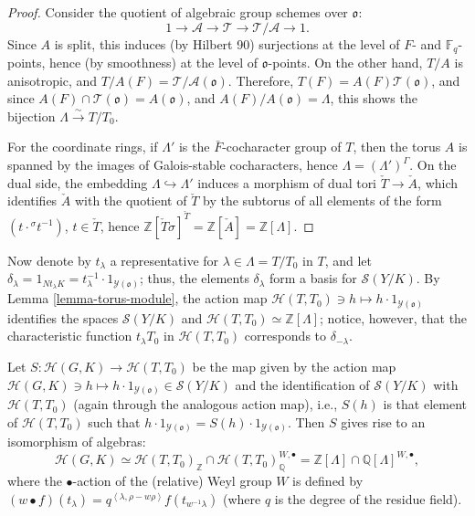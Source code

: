 \begin{proof}
 Consider the quotient of algebraic group schemes over $\mathfrak o$:
 $$ 1\to \mathcal A \to \mathcal T \to \mathcal T/\mathcal A\to 1.$$
 Since $A$ is split, this induces (by Hilbert 90) surjections at the level of $F$- and $\mathbb F_q$-points, hence (by smoothness) at the level of $\mathfrak o$-points.  On the other hand, $T/A$ is anisotropic, and $T/A(F)=\mathcal T/\mathcal A(\mathfrak o)$. Therefore, $T(F) = A(F) \mathcal T(\mathfrak o)$, and since $A(F)\cap \mathcal T(\mathfrak o) = A(\mathfrak o)$, and $A(F)/A(\mathfrak o) = \Lambda$, this shows the bijection $\Lambda \xrightarrow\sim T/T_0$.
 
 For the coordinate rings, if $\Lambda'$ is the $\bar F$-cocharacter group of $T$, then the torus $A$ is spanned by the images of Galois-stable cocharacters, hence $\Lambda = (\Lambda')^\Gamma$. On the dual side, the embedding $\Lambda \hookrightarrow \Lambda'$ induces a morphism of dual tori $\check T \to \check A$, which identifies $\check A$ with the quotient of $\check T$ by the subtorus of all elements of the form $(t\cdot {^\sigma t^{-1}})$, $t\in \check T$, hence   
 $\mathbb Z[\check T\sigma ]^{\check T} = \mathbb Z[\check A] = \mathbb Z[\Lambda]$.
\end{proof}

Now denote by $t_\lambda$ a representative for $\lambda \in \Lambda = T/T_0$ in $T$, and let $\delta_\lambda=1_{N t_\lambda K} = t_\lambda^{-1}\cdot 1_{\mathcal Y(\mathfrak o)}$; thus, the elements $\delta_\lambda$ form a basis for $\mathcal S(Y/K)$. By Lemma \ref{lemma-torus-module}, the action map $\mathcal H(T,T_0)\ni h \mapsto h\cdot 1_{\mathcal Y(\mathfrak o)}$ identifies the spaces $\mathcal S(Y/K)$ and $\mathcal H(T,T_0)\simeq \mathbb Z[\Lambda]$; notice, however, that the characteristic function $t_\lambda T_0$ in $\mathcal H(T,T_0)$ corresponds to $\delta_{-\lambda}$. 

\begin{theorem}
 Let $S: \mathcal H(G,K) \to \mathcal H(T,T_0)$ be the map given by the action map $\mathcal H(G,K)\ni h \mapsto h\cdot 1_{\mathcal Y(\mathfrak o)} \in \mathcal S(Y/K)$ and the identification of $\mathcal S(Y/K)$ with $\mathcal H(T,T_0)$ (again through the analogous action map), i.e., $S(h)$ is that element of $\mathcal H(T,T_0)$ such that $h\cdot 1_{\mathcal Y(\mathfrak o)} = S(h)\cdot 1_{\mathcal Y(\mathfrak o)} $. Then $S$ gives rise to an isomorphism of algebras: 
 \begin{equation}
 \label{equation-Satake}
 \mathcal H(G,K) \simeq \mathcal H(T,T_0)_{\mathbb Z} \cap \mathcal H(T,T_0)_{\mathbb Q}^{W,\bullet} = \mathbb Z[\Lambda]\cap \mathbb Q[\Lambda]^{W,\bullet},
 \end{equation}
 where the $\bullet$-action of the (relative) Weyl group $W$ is defined by $(w\bullet f)(t_\lambda)  = q^{\left < \lambda, \rho - w\rho \right>} f(t_{w^{-1}\lambda})$ (where $q$ is the degree of the residue field).
\end{theorem}

